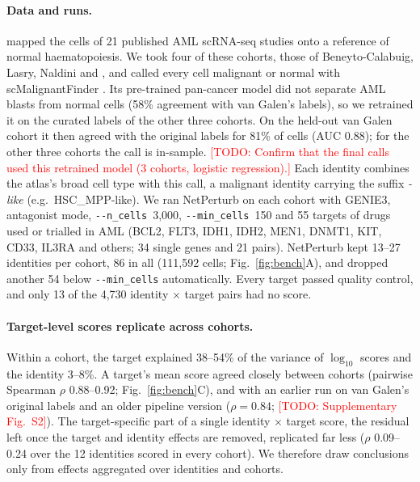 \documentclass[unnumsec,webpdf,contemporary,large]{oup-authoring-template}
\newcommand{\todo}[1]{\textcolor{red}{[TODO: #1]}}
\newcommand{\param}[1]{\texttt{-{}-#1}}
\begin{document}
\paragraph{Data and runs.} \citet{Zeng2025bonemarrowmap} mapped the cells of 21 published AML scRNA-seq studies onto a reference of normal haematopoiesis. We took four of these cohorts, those of Beneyto-Calabuig, Lasry, Naldini and \citet{vanGalen2019aml}, and called every cell malignant or normal with scMalignantFinder \citep{Yu2025scmalignantfinder}. Its pre-trained pan-cancer model did not separate AML blasts from normal cells (58\% agreement with van Galen's labels), so we retrained it on the curated labels of the other three cohorts. On the held-out van Galen cohort it then agreed with the original labels for 81\% of cells (AUC 0.88); for the other three cohorts the call is in-sample. \todo{Confirm that the final calls used this retrained model (3 cohorts, logistic regression).} Each identity combines the atlas's broad cell type with this call, a malignant identity carrying the suffix \emph{-like} (e.g.\ HSC\_MPP-like). We ran NetPerturb on each cohort with GENIE3, antagonist mode, \param{n\_cells}~3,000, \param{min\_cells}~150 and 55 targets of drugs used or trialled in AML (BCL2, FLT3, IDH1, IDH2, MEN1, DNMT1, KIT, CD33, IL3RA and others; 34 single genes and 21 pairs). NetPerturb kept 13--27 identities per cohort, 86 in all (111,592 cells; Fig.~\ref{fig:bench}A), and dropped another 54 below \param{min\_cells} automatically. Every target passed quality control, and only 13 of the 4,730 identity $\times$ target pairs had no score.

\paragraph{Target-level scores replicate across cohorts.} Within a cohort, the target explained 38--54\% of the variance of $\log_{10}$ scores and the identity 3--8\%. A target's mean score agreed closely between cohorts (pairwise Spearman $\rho$ 0.88--0.92; Fig.~\ref{fig:bench}C), and with an earlier run on van Galen's original labels and an older pipeline version ($\rho=0.84$; \todo{Supplementary Fig.~S2}). The target-specific part of a single identity $\times$ target score, the residual left once the target and identity effects are removed, replicated far less ($\rho$ 0.09--0.24 over the 12 identities scored in every cohort). We therefore draw conclusions only from effects aggregated over identities and cohorts.
\end{document}
